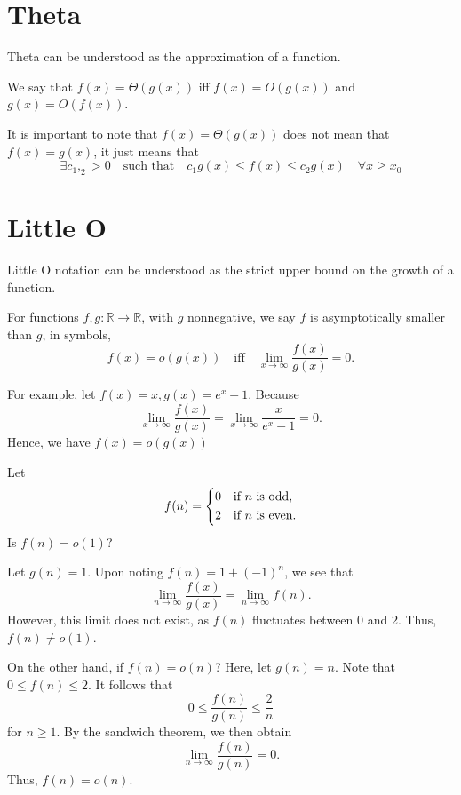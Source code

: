 \section{Theta}
Theta can be understood as the approximation of a function. 
\begin{definition}
    We say that \(f(x) = \Theta(g(x))\) iff \(f(x) = O(g(x))\) and \(g(x) = O(f(x))\). 
    \begin{remark}
        It is important to note that \(f(x) = \Theta(g(x))\) does not mean that \(f(x) = g(x)\), it just means that
    \[
        \exists c_1, _2 > 0 \quad\text{such that}\quad c_1 g(x) \leq f(x) \leq c_2 g(x)\quad \forall x \geq  x_0 
    \] 
    \end{remark}
    
\end{definition}

\section{Little O}
Little O notation can be understood as the strict upper bound on the growth of a function.

\begin{definition}
    For functions \(f, g: \mathbb{R} \to \mathbb{R}\), with \(g\) nonnegative, we say \(f\) is asymptotically smaller than \(g\), in symbols,
    \[
        f(x) = o(g(x))\quad\text{iff}\quad\lim_{x \to \infty} \dfrac{f(x)}{g(x)} = 0. 
    \]
\end{definition}

\begin{eg}
    For example, let \(f(x) = x, g(x) = e^x - 1\). Because 
    \[
        \lim_{x \to \infty} \dfrac{f(x)}{g(x)} = \lim_{x \to \infty} \dfrac{x}{e^x - 1} = 0.
    \]
    Hence, we have \(f(x) = o(g(x))\) 
\end{eg}
\newpage
\begin{eg}
Let
\[
    f(n) = \begin{dcases}
        0\quad \text{if \(n\) is odd},\\
        2\quad \text{if \(n\) is even}.
    \end{dcases}
\]
Is \(f(n) = o(1)\)?

Let \(g(n) = 1\). Upon noting \(f(n) = 1 + (-1)^n\), we see that
\[
    \lim_{n \to \infty} \dfrac{f(x)}{g(x)} = \lim_{n \to \infty} f(n).
\] 
However, this limit does not exist, as \(f(n)\) fluctuates between 0 and 2. Thus, \(f(n) \neq o(1)\).

On the other hand, if \(f(n) = o(n)\)? Here, let \(g(n) = n\). Note that \(0 \leq f(n) \leq 2\). It follows that 
\[
    0 \leq \dfrac{f(n)}{g(n)} \leq \dfrac{2}{n}
\]
for \(n \geq 1\). By the sandwich theorem, we then obtain
\[
    \lim_{n \to \infty} \dfrac{f(n)}{g(n)} = 0.
\] 
Thus, \(f(n) = o(n)\).
\end{eg}

